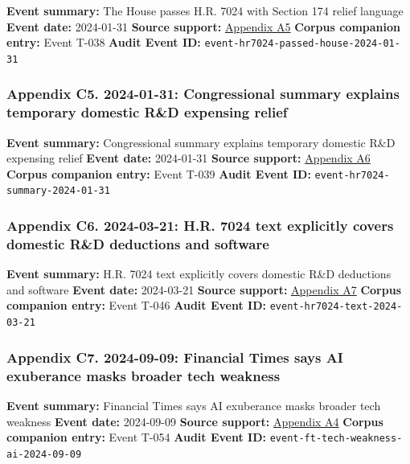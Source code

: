 \documentclass[
  american,
  11pt,
  letterpaper,
]{article}
\begin{document}
\textbf{Event summary:} The House passes H.R. 7024 with Section 174
relief language \textbf{Event date:} 2024-01-31 \textbf{Source support:}
\hyperref[ch-05-appendix-a5-h-r-7024-tax-relief-for-american-families-and-workers-act-of-2024]{Appendix
A5} \textbf{Corpus companion entry:} Event T-038 \textbf{Audit Event
ID:} \texttt{event-hr7024-passed-house-2024-01-31}

\subsubsection{Appendix C5. 2024-01-31: Congressional summary explains
temporary domestic R\&D expensing
relief}\label{ch-05-appendix-c5-2024-01-31-congressional-summary-explains-temporary-domestic-r-d-expensing-relief}

\textbf{Event summary:} Congressional summary explains temporary
domestic R\&D expensing relief \textbf{Event date:} 2024-01-31
\textbf{Source support:}
\hyperref[ch-05-appendix-a6-h-r-7024-tax-relief-for-american-families-and-workers-act-of-2024-crs-summary]{Appendix
A6} \textbf{Corpus companion entry:} Event T-039 \textbf{Audit Event
ID:} \texttt{event-hr7024-summary-2024-01-31}

\subsubsection{Appendix C6. 2024-03-21: H.R. 7024 text explicitly covers
domestic R\&D deductions and
software}\label{ch-05-appendix-c6-2024-03-21-h-r-7024-text-explicitly-covers-domestic-r-d-deductions-and-software}

\textbf{Event summary:} H.R. 7024 text explicitly covers domestic R\&D
deductions and software \textbf{Event date:} 2024-03-21 \textbf{Source
support:}
\hyperref[ch-05-appendix-a7-h-r-7024-text-deduction-for-domestic-research-and-experimental-expenditures]{Appendix
A7} \textbf{Corpus companion entry:} Event T-046 \textbf{Audit Event
ID:} \texttt{event-hr7024-text-2024-03-21}

\subsubsection{Appendix C7. 2024-09-09: Financial Times says AI
exuberance masks broader tech
weakness}\label{ch-05-appendix-c7-2024-09-09-financial-times-says-ai-exuberance-masks-broader-tech-weakness}

\textbf{Event summary:} Financial Times says AI exuberance masks broader
tech weakness \textbf{Event date:} 2024-09-09 \textbf{Source support:}
\hyperref[ch-05-appendix-a4-ai-exuberance-masks-broad-weakness-in-tech-sector-say-investors]{Appendix
A4} \textbf{Corpus companion entry:} Event T-054 \textbf{Audit Event
ID:} \texttt{event-ft-tech-weakness-ai-2024-09-09}
\end{document}
